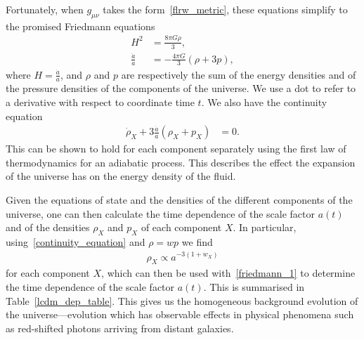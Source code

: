     Fortunately, when $g_{\mu\nu}$ takes the form~\eqref{flrw_metric},
    these equations simplify to the promised Friedmann equations
    \begin{align}\label{friedmann_1}
        H^2 &= \frac{8\pi G \rho}{3},\\
        \frac{\ddot{a}}{a} &= -\frac{4\pi G}{3}\left(\rho+3p\right),
    \end{align}
    where $H=\frac{\dot{a}}{a}$, and $\rho$ and $p$ are respectively the sum of the
    energy densities and of the pressure densities of the
    components of the universe.
    We use a dot to refer to a derivative with respect to coordinate time $t$.
    We also have the continuity equation
    \begin{align}\label{continuity_equation}
        \dot{\rho}_X + 3\frac{\dot{a}}{a}\left(\rho_X+p_X\right) &= 0.
    \end{align}
    This can be shown to hold for each component
    separately using the first law of thermodynamics for an adiabatic process.
    This describes
    the effect the expansion of the universe has on the energy density of the fluid.

    Given the equations of state and the densities of the different
    components of the universe, one can then calculate the time dependence of the
    scale factor $a(t)$ and of the densities $\rho_X$ and $p_X$ of each component $X$.
    In particular, using~\eqref{continuity_equation} and $\rho=wp$
    we find
    \begin{align}\label{rho_a_dep_X}
        \rho_X\propto a^{-3(1+w_X)}
    \end{align}
    for each component $X$, which can then be used with~\eqref{friedmann_1}
    to determine the time dependence of the scale factor
    $a(t)$. This is summarised in Table~\ref{lcdm_dep_table}.
    This gives us the homogeneous background evolution of the universe---evolution
    which has observable effects in physical phenomena
    such as red-shifted photons arriving from distant galaxies.


